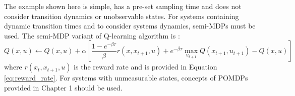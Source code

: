 The example shown here is simple, has a pre-set sampling time and does not consider transition dynamics or unobservable states. For systems containing dynamic transition times and to consider systems dynamics, semi-MDPs must be used.  The semi-MDP variant of Q-learning algorithm is \cite{continuous_rl_ref14}:
\begin{equation}
    Q(x, u) \leftarrow Q(x, u) + \alpha \left[\frac{1 - e^{-\beta \tau}}{\beta}r(x, x_{t+1}, u) + e^{-\beta \tau} \max_{u_{t+1}}Q(x_{t+1}, u_{t+1}) - Q(x, u) \right]
\end{equation}
where $r(x_t, x_{t+1}, u)$ is the reward rate and is provided in Equation \ref{eq:reward_rate}. For systems with unmeasurable states, concepts of POMDPs provided in Chapter 1 should be used.























